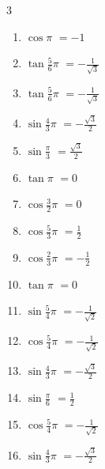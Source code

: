 \begin{multicols}{3}
\begin{enumerate}
  \item $\displaystyle \cos{\pi}$
        $\displaystyle =-1$

  \item $\displaystyle \tan{\frac{5}{6}\pi}$
        $\displaystyle =-\frac{1}{\sqrt{3}}$

\columnbreak %

  \item $\displaystyle \tan{\frac{5}{6}\pi}$
        $\displaystyle =-\frac{1}{\sqrt{3}}$

  \item $\displaystyle \sin{\frac{4}{3}\pi}$
        $\displaystyle =-\frac{\sqrt{3}}{2}$

  \item $\displaystyle \sin{\frac{\pi}{3}}$
        $\displaystyle =\frac{\sqrt{3}}{2}$

  \item $\displaystyle \tan{\pi}$
        $\displaystyle =0$

  \item $\displaystyle \cos{\frac{3}{2}\pi}$
        $\displaystyle =0$

  \item $\displaystyle \cos{\frac{5}{3}\pi}$
        $\displaystyle =\frac{1}{2}$

  \item $\displaystyle \cos{\frac{2}{3}\pi}$
        $\displaystyle =-\frac{1}{2}$

  \item $\displaystyle \tan{\pi}$
        $\displaystyle =0$

  \item $\displaystyle \sin{\frac{5}{4}\pi}$
        $\displaystyle =-\frac{1}{\sqrt{2}}$

  \item $\displaystyle \cos{\frac{5}{4}\pi}$
        $\displaystyle =-\frac{1}{\sqrt{2}}$

  \item $\displaystyle \sin{\frac{4}{3}\pi}$
        $\displaystyle =-\frac{\sqrt{3}}{2}$

  \item $\displaystyle \sin{\frac{\pi}{6}}$
        $\displaystyle =\frac{1}{2}$

  \item $\displaystyle \cos{\frac{5}{4}\pi}$
        $\displaystyle =-\frac{1}{\sqrt{2}}$

  \item $\displaystyle \sin{\frac{4}{3}\pi}$
        $\displaystyle =-\frac{\sqrt{3}}{2}$


\end{enumerate}
\end{multicols}
